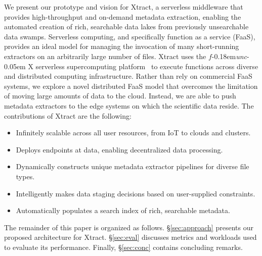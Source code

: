 \documentclass[sigconf, 9pt]{acmart}
\newcommand{\tyler}[1]{}
\newcommand{\kyle}[1]{}
\newcommand{\tyler}[1]{{\textcolor{cyan}{ tyler: #1 }}}
\newcommand{\kyle}[1]{{\textcolor{purple}{ Kyle: #1 }}}
\newcommand{\name}{Xtract}
\newcommand{\funcx}{$f$\kern-0.18em\emph{unc}\kern-0.05em X}
\begin{document}
We present our prototype and vision for \name{},
a serverless middleware that provides high-throughput and on-demand metadata 
extraction, enabling the automated creation of rich, searchable data lakes from previously unsearchable data swamps. 
Serverless computing, and specifically function as a service (FaaS),
provides an ideal model for managing the invocation of
many short-running extractors on an arbitrarily large number of files. 
\name{} uses the \funcx{} serverless supercomputing platform~\cite{chard2019serverless}
to execute functions across diverse and distributed computing infrastructure.
Rather than rely on commercial FaaS systems, we explore a novel distributed FaaS model 
that overcomes the limitation of moving large amounts of data to the cloud. 
Instead, we are able to push
metadata extractors to the edge systems on which the scientific data reside. 
The contributions of \name{} are the following: 
\begin{itemize}
\item Infinitely scalable across all user resources, from IoT to clouds and clusters. 
\item Deploys endpoints at data, enabling decentralized data processing. 
\item Dynamically constructs unique metadata extractor pipelines for diverse file types. 
\item Intelligently makes data staging decisions based on user-supplied constraints. 
\item Automatically populates a search index of rich, searchable metadata. 
\end{itemize}



The remainder of this paper is organized as follows. 
\S\ref{sec:approach} presents our proposed architecture for \name{}. 
\S\ref{sec:eval} discusses metrics and workloads used to evaluate its performance. 
Finally, \S\ref{sec:conc} contains concluding remarks.
\end{document}
